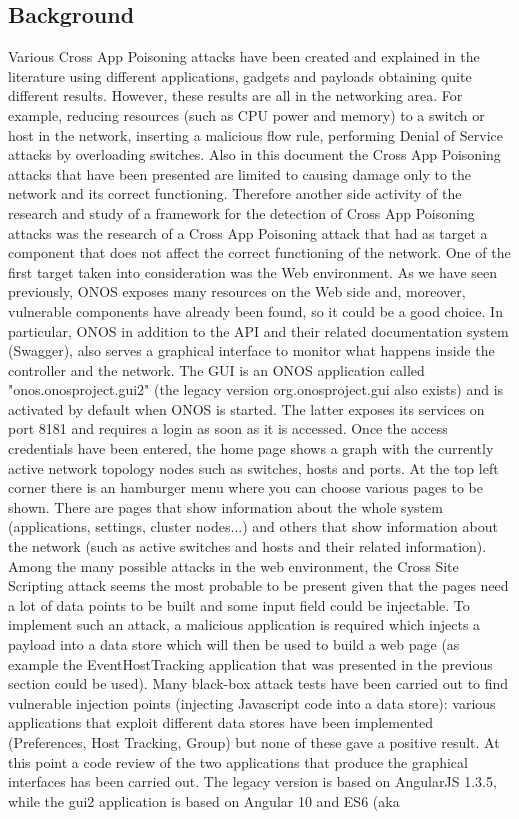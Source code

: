 \documentclass[a4paper,10pt]{memoir}
\begin{document}
\subsection{Background}

Various Cross App Poisoning attacks have been created and explained in the literature using different applications, gadgets and payloads obtaining quite different results. However, these results are all in the networking area. For example, reducing resources (such as CPU power and memory) to a switch or host in the network, inserting a malicious flow rule, performing Denial of Service attacks by overloading switches. Also in this document the Cross App Poisoning attacks that have been presented are limited to causing damage only to the network and its correct functioning. Therefore another side activity of the research and study of a framework for the detection of Cross App Poisoning attacks was the research of a Cross App Poisoning attack that had as target a component that does not affect the correct functioning of the network. One of the first target taken into consideration was the Web environment. As we have seen previously, ONOS exposes many resources on the Web side and, moreover, vulnerable components have already been found, so it could be a good choice. In particular, ONOS in addition to the API and their related documentation system (Swagger), also serves a graphical interface to monitor what happens inside the controller and the network. The GUI is an ONOS application called "onos.onosproject.gui2" (the legacy version org.onosproject.gui also exists) and is activated by default when ONOS is started. The latter exposes its services on port 8181 and requires a login as soon as it is accessed. Once the access credentials have been entered, the home page shows a graph with the currently active network topology nodes such as switches, hosts and ports. At the top left corner there is an hamburger menu where you can choose various pages to be shown. There are pages that show information about the whole system (applications, settings, cluster nodes...) and others that show information about the network (such as active switches and hosts and their related information). Among the many possible attacks in the web environment, the Cross Site Scripting attack seems the most probable to be present given that the pages need a lot of data points to be built and some input field could be injectable. To implement such an attack, a malicious application is required which injects a payload into a data store which will then be used to build a web page (as example the EventHostTracking application that was presented in the previous section could be used). Many black-box attack tests have been carried out to find vulnerable injection points (injecting Javascript code into a data store): various applications that exploit different data stores have been implemented (Preferences, Host Tracking, Group) but none of these gave a positive result. At this point a code review of the two applications that produce the graphical interfaces has been carried out. The legacy version is based on AngularJS 1.3.5, while the gui2 application is based on Angular 10 and ES6 (aka 
\end{document}
